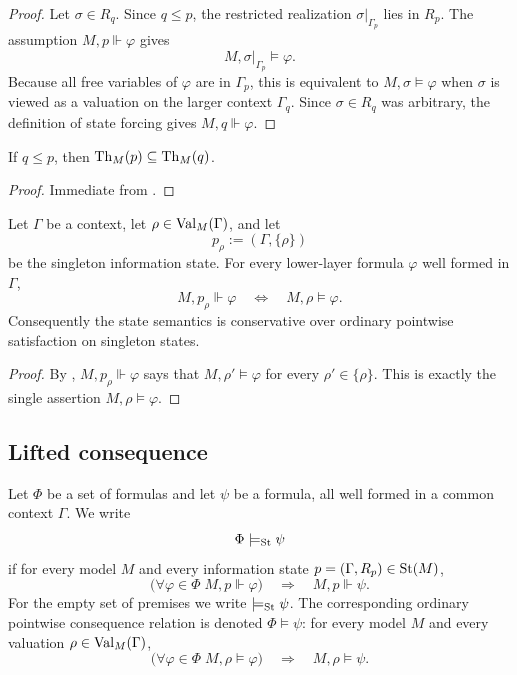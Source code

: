 \begin{proof}
Let $\sigma\in R_q$. Since $q\le p$, the restricted realization
$\sigma|_{\Gamma_p}$ lies in $R_p$. The assumption $M,p\Vdash\varphi$ gives
\[
M,\sigma|_{\Gamma_p}\models\varphi .
\]
Because all free variables of $\varphi$ are in $\Gamma_p$, this is equivalent
to $M,\sigma\models\varphi$ when $\sigma$ is viewed as a valuation on the larger
context $\Gamma_q$. Since $\sigma\in R_q$ was arbitrary, the definition of
state forcing gives $M,q\Vdash\varphi$.
\end{proof}

\begin{corollary}\label{cor:state-theory-monotonicity}
If $q\le p$, then $\mathrm{Th}_M(p)\subseteq \mathrm{Th}_M(q)$.
\end{corollary}

\begin{proof}
Immediate from .
\end{proof}

\begin{proposition}\label{prop:singleton-conservativity}
Let $\Gamma$ be a context, let $\rho\in\mathrm{Val}_M(\Gamma)$, and let
\[
p_\rho:=(\Gamma,\{\rho\})
\]
be the singleton information state. For every lower-layer formula $\varphi$
well formed in $\Gamma$,
\[
M,p_\rho\Vdash\varphi
\quad\Longleftrightarrow\quad
M,\rho\models\varphi .
\]
Consequently the state semantics is conservative over ordinary pointwise
satisfaction on singleton states.
\end{proposition}

\begin{proof}
By , $M,p_\rho\Vdash\varphi$ says that
$M,\rho'\models\varphi$ for every $\rho'\in\{\rho\}$. This is exactly the
single assertion $M,\rho\models\varphi$.
\end{proof}

\subsection{Lifted consequence}

\begin{definition}\label{def:state-semantic-consequence}
Let $\Phi$ be a set of formulas and let $\psi$ be a formula, all well formed in
a common context $\Gamma$. We write
\[
\Phi\models_{\mathrm{St}}\psi
\]
if for every model $M$ and every information state
$p=(\Gamma,R_p)\in\mathrm{St}(M)$,
\[
\bigl(\forall\varphi\in\Phi\; M,p\Vdash\varphi\bigr)
\quad\Longrightarrow\quad
M,p\Vdash\psi .
\]
For the empty set of premises we write $\models_{\mathrm{St}}\psi$. The corresponding
ordinary pointwise consequence relation is denoted $\Phi\models\psi$:
for every model $M$ and every valuation $\rho\in\mathrm{Val}_M(\Gamma)$,
\[
\bigl(\forall\varphi\in\Phi\; M,\rho\models\varphi\bigr)
\quad\Longrightarrow\quad
M,\rho\models\psi .
\]
\end{definition}

